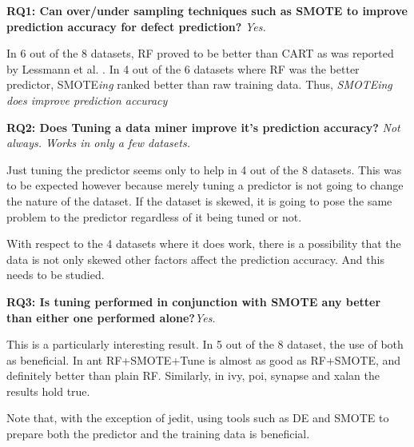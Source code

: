 \documentclass[12pt]{IEEEtran}
\begin{document}
{\textbf{RQ1:  Can over/under sampling techniques such as SMOTE to improve prediction accuracy for defect prediction?} \textit{Yes.}}

In 6 out of the 8 datasets, RF proved to be better than CART as was reported by Lessmann et al. \cite{lessmann}.
In 4 out of the 6 datasets where RF was the better predictor, SMOTE\textit{ing} ranked better than raw training data. Thus, \textit{SMOTEing does improve prediction accuracy} 

{{\bfseries RQ2: Does Tuning a data miner improve it's prediction accuracy?} \textit{Not always. Works in only a few datasets.}}


Just tuning the predictor seems only to help in 4 out of the 8 datasets. This was to be expected however because merely tuning a predictor is not going to change the nature of the dataset. If the dataset is skewed, it is going to pose the same problem to the predictor regardless of it being tuned or not. 

With respect to the 4 datasets where it does work, there is a possibility that the data is not only skewed other factors affect the prediction accuracy. And this needs to be studied.

{{\bfseries RQ3: Is tuning performed in conjunction with SMOTE any better than either one performed alone?}\textit{Yes.}}

This is a particularly interesting result. In 5 out of the 8 dataset, the use of both as beneficial. In ant RF+SMOTE+Tune is almost as good as RF+SMOTE, and definitely better than plain RF. Similarly, in ivy, poi, synapse and xalan the results hold true. 

Note that, with the exception of jedit, using tools such as DE and SMOTE to prepare both the predictor and the training data is beneficial.
\end{document}
